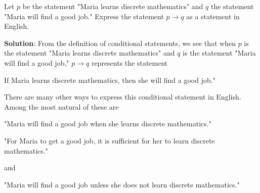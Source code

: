 \documentclass{Axon}
\begin{document}
\begin{example}\label{Example: 10}
    Let \(p\) be the statement "Maria learns discrete mathematics" and \(q\) the statement "Maria will find a good job." Express the statement \(p \to q\) as a statement in English.

    \noindent
    \textbf{Solution}:
    From the definition of conditional statements, we see that when \(p\) is the statement "Maria learns discrete mathematics" and \(q\) is the statement "Maria will find a good job," \(p \to q\) represents the statement
    \begin{center}
        If Maria learns discrete mathematics, then she will find a good job."
    \end{center}
    There are many other ways to express this conditional statement in English. Among the most natural of these are
    \begin{center}
        "Maria will find a good job when she learns discrete mathematics."
    \end{center}
    \begin{center}
        "For Maria to get a good job, it is sufficient for her to learn discrete mathematics."
    \end{center}
    and
    \begin{center}
        "Maria will find a good job unless she does not learn discrete mathematics."
    \end{center}
\end{example}
\end{document}

